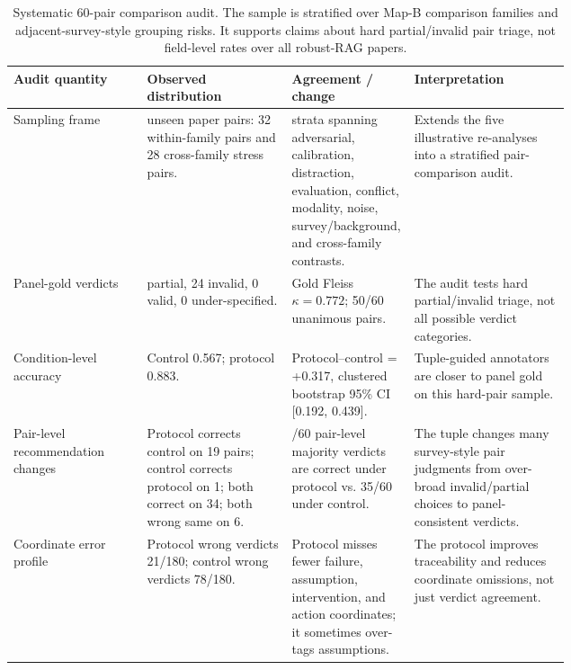 \documentclass[11pt]{article}
\begin{document}
\begin{table}[t]
\centering
\scriptsize
\renewcommand{\arraystretch}{0.9}
\begin{tabularx}{\linewidth}{>{\raggedright\arraybackslash}p{0.24\linewidth}>{\raggedright\arraybackslash}p{0.26\linewidth}>{\raggedright\arraybackslash}p{0.22\linewidth}X}
\toprule
\textbf{Audit quantity} & \textbf{Observed distribution} & \textbf{Agreement / change} & \textbf{Interpretation} \\
\midrule
Sampling frame & 60 unseen paper pairs: 32 within-family pairs and 28 cross-family stress pairs. & 13 strata spanning adversarial, calibration, distraction, evaluation, conflict, modality, noise, survey/background, and cross-family contrasts. & Extends the five illustrative re-analyses into a stratified pair-comparison audit. \\
Panel-gold verdicts & 36 partial, 24 invalid, 0 valid, 0 under-specified. & Gold Fleiss $\kappa=0.772$; 50/60 unanimous pairs. & The audit tests hard partial/invalid triage, not all possible verdict categories. \\
Condition-level accuracy & Control 0.567; protocol 0.883. & Protocol--control = +0.317, clustered bootstrap 95\% CI [0.192, 0.439]. & Tuple-guided annotators are closer to panel gold on this hard-pair sample. \\
Pair-level recommendation changes & Protocol corrects control on 19 pairs; control corrects protocol on 1; both correct on 34; both wrong same on 6. & 53/60 pair-level majority verdicts are correct under protocol vs. 35/60 under control. & The tuple changes many survey-style pair judgments from over-broad invalid/partial choices to panel-consistent verdicts. \\
Coordinate error profile & Protocol wrong verdicts 21/180; control wrong verdicts 78/180. & Protocol misses fewer failure, assumption, intervention, and action coordinates; it sometimes over-tags assumptions. & The protocol improves traceability and reduces coordinate omissions, not just verdict agreement. \\
\bottomrule
\end{tabularx}
\caption{Systematic 60-pair comparison audit. The sample is stratified over Map-B comparison families and adjacent-survey-style grouping risks. It supports claims about hard partial/invalid pair triage, not field-level rates over all robust-RAG papers.}
\label{tab:systematic-pair-audit-summary}
\end{table}
\end{document}
